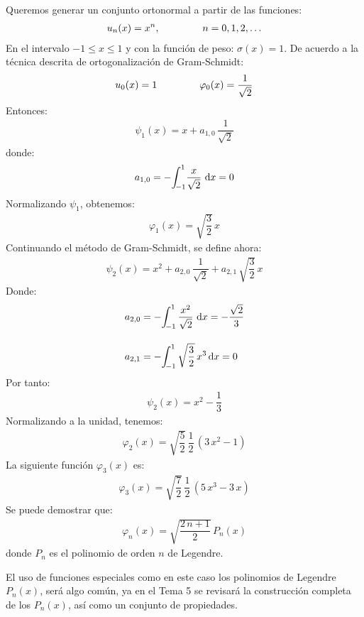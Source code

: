 \documentclass[12pt]{article}
\def\scaleint#1{\vcenter{\hbox{\scaleto[3ex]{\displaystyle\int}{#1}}}}
\def\bs{\mkern-12mu}
\numberwithin{equation}{section}
\begin{document}
Queremos generar un conjunto ortonormal a partir de las funciones:
\begin{align*}
u_{n} (x) = x^{n}, \hspace{1.5cm} n = 0, 1, 2, \ldots
\end{align*}
En el intervalo $-1 \leq x \leq 1$ y con la función de peso: $\sigma (x) = 1$. De acuerdo a la técnica descrita de ortogonalización de Gram-Schmidt:
\begin{align}
u_{0} (x) = 1 \hspace{1.5cm} \varphi_{0} (x) =  \dfrac{1}{\sqrt{2}}
\label{eq:ecuacion_10_50}
\end{align}
Entonces:
\begin{align}
\psi_{1} (x) = x + a_{1,0} \, \dfrac{1}{\sqrt{2}}
\label{eq:ecuacion_10_51}
\end{align}
donde:
\begin{align}
a_{1, 0} = - \scaleint{5ex}_{\bs -1}^{1} \dfrac{x}{\sqrt{2}} \, \dd{x} = 0
\label{eq:ecuacion_10_52}
\end{align}
Normalizando $\psi_{1}$, obtenemos:
\begin{align}
\varphi_{1} (x) = \sqrt{\dfrac{3}{2}} \, x
\label{eq:ecuacion_10_53}
\end{align}
Continuando el método de Gram-Schmidt, se define ahora:
\begin{align}
\psi_{2} (x) = x^{2} +  a_{2, 0} \, \dfrac{1}{\sqrt{2}} +  a_{2, 1} \, \sqrt{\dfrac{3}{2}} \, x
\label{eq:ecuacion_10_54}
\end{align}
Donde:
\begin{align}
a_{2, 0} &=  - \scaleint{5ex}_{\bs -1}^{1} \, \dfrac{x^{2}}{\sqrt{2}} \, \dd{x} =  - \dfrac{\sqrt{2}}{3} \label{eq:ecuacion_10_55} \\[1em] 
a_{2, 1} &=  - \scaleint{5ex}_{\bs -1}^{1} \, \sqrt{\dfrac{3}{2}} \, x^{3} \dd{x} =  0 \label{eq:ecuacion_10_56}
\end{align}
Por tanto:
\begin{align}
\psi_{2} (x) = x^{2} - \dfrac{1}{3}
\label{eq:ecuacion_10_57}
\end{align}
Normalizando a la unidad, tenemos:
\begin{align}
\varphi_{2} (x) = \sqrt{\dfrac{5}{2}} \, \dfrac{1}{2} \, (3 \, x^{2} - 1)
\label{eq:ecuacion_10_58}
\end{align}
La siguiente función $\varphi_{3}(x)$ es:
\begin{align}
\varphi_{3} (x) = \sqrt{\dfrac{7}{2}} \, \dfrac{1}{2} \, (5 \, x^{3} - 3 \, x)
\label{eq:ecuacion_10_59}
\end{align}
Se puede demostrar que:
\begin{align}
\varphi_{n} (x) = \sqrt{\dfrac{2 \, n + 1}{2}} \, P_{n} (x)
\label{eq:ecuacion_10_60}
\end{align}
donde $P_{n}$ es el polinomio de orden $n$ de Legendre.
\par
El uso de funciones especiales como en este caso los polinomios de Legendre $P_{n}(x)$, será algo común, ya en el Tema 5 se revisará la construcción completa de los $P_{n}(x)$, así como un conjunto de propiedades.
\end{document}
